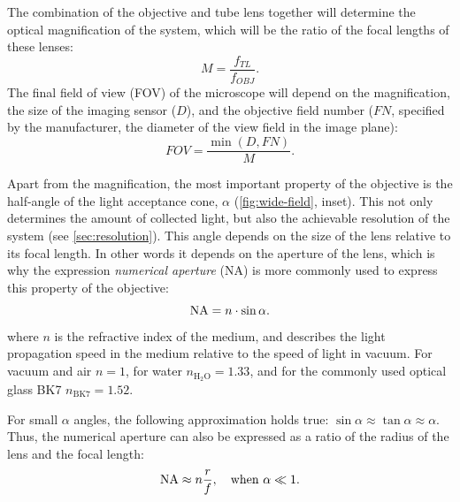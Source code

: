     The combination of the objective and tube lens together will determine the optical magnification of the system, which will be the ratio of the focal lengths of these lenses:
    \begin{equation}
      M = \frac{f_{TL}}{f_{OBJ}}.
      \label{eq:magnification}
    \end{equation}
    The final field of view (FOV) of the microscope will depend on the magnification, the size of the imaging sensor ($D$), and the objective field number ($FN$, specified by the manufacturer, the diameter of the view field in the image plane):
    \begin{equation}
      FOV = \frac{\min(D, FN)}{M}.
      \label{eq:FOV}
    \end{equation}

    Apart from the magnification, the most important property of the objective is the half-angle of the light acceptance cone, $\alpha$ (\autoref{fig:wide-field}, inset). This not only determines the amount of collected light, but also the achievable resolution of the system (see \autoref{sec:resolution}). This angle depends on the size of the lens relative to its focal length. In other words it depends on the aperture of the lens, which is why the expression \textit{numerical aperture} (NA) is more commonly used to express this property of the objective:
    \begin{equation}
      \operatorname{NA} = n\cdot \sin \alpha.
      \label{eq:NA}
    \end{equation}
    where $n$ is the refractive index of the medium, and describes the light propagation speed in the medium relative to the speed of light in vacuum. For vacuum and air $n=1$, for water $n_\mathrm{H_2O}=1.33$, and for the commonly used optical glass BK7 $n_\mathrm{BK7} = 1.52$.

    For small $\alpha$ angles, the following approximation holds true: $\sin \alpha \approx \tan \alpha \approx \alpha$. Thus, the numerical aperture can also be expressed as a ratio of the radius of the lens and the focal length:
    \begin{equation}
      \operatorname{NA} \approx n \frac{r}{f},\quad \text{when }\alpha \ll 1.
    \end{equation}


